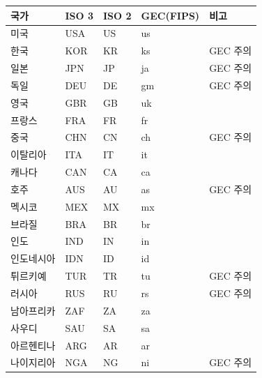 \documentclass[11pt,a4paper]{article}
\begin{document}
\begin{longtable}{l l l l l}
\toprule
\textbf{국가} & \textbf{ISO 3} & \textbf{ISO 2} & \textbf{GEC(FIPS)} & \textbf{비고} \\
\midrule
\endhead
미국       & USA & US & us & \\
한국       & KOR & KR & ks & GEC 주의 \\
일본       & JPN & JP & ja & GEC 주의 \\
독일       & DEU & DE & gm & GEC 주의 \\
영국       & GBR & GB & uk & \\
프랑스     & FRA & FR & fr & \\
중국       & CHN & CN & ch & GEC 주의 \\
이탈리아   & ITA & IT & it & \\
캐나다     & CAN & CA & ca & \\
호주       & AUS & AU & as & GEC 주의 \\
멕시코     & MEX & MX & mx & \\
브라질     & BRA & BR & br & \\
인도       & IND & IN & in & \\
인도네시아 & IDN & ID & id & \\
튀르키예   & TUR & TR & tu & GEC 주의 \\
러시아     & RUS & RU & rs & GEC 주의 \\
남아프리카 & ZAF & ZA & za & \\
사우디     & SAU & SA & sa & \\
아르헨티나 & ARG & AR & ar & \\
나이지리아 & NGA & NG & ni & GEC 주의 \\
\bottomrule
\end{longtable}
\end{document}
